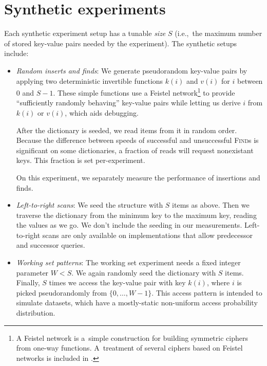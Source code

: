 \section{Synthetic experiments}
Each synthetic experiment setup has a tunable \emph{size} $S$
(i.e.,\ the maximum number of stored key-value pairs needed by the experiment).
The synthetic setups include:
\begin{itemize}
\item
	\emph{Random inserts and finds}: We generate pseudorandom key-value
	pairs by applying two deterministic invertible functions $k(i)$
	and $v(i)$ for $i$ between 0 and $S-1$.
	These simple functions use a Feistel network\footnote{%
		A Feistel network is a~simple construction for building
		symmetric ciphers from one-way functions. A~treatment of
		several ciphers based on Feistel networks is included in
		\cite{applied-cryptography}.
	} to provide
	``sufficiently randomly behaving'' key-value pairs while letting us
	derive $i$ from $k(i)$ or $v(i)$, which aids debugging.

	After the dictionary is seeded, we read items from it in random order.
	Because the difference between speeds of successful and unsuccessful
	\textsc{Find}s is significant on some dictionaries, a fraction of
	reads will request nonexistant keys. This fraction is set
	per-experiment.

	On this experiment, we separately measure the performance of insertions
	and finds.

\item
	\emph{Left-to-right scans}: We seed the structure with $S$ items
	as above. Then we traverse the dictionary from the minimum key to
	the maximum key, reading the values as we go. We don't include
	the seeding in our measurements.
	Left-to-right scans are only available on implementations that
	allow predecessor and successor queries.

\item
	\emph{Working set patterns}: The working set experiment needs
	a fixed integer parameter $W<S$. We again randomly seed the dictionary
	with $S$ items. Finally, $S$ times we access the key-value pair
	with key $k(i)$, where $i$ is picked pseudorandomly from
	$\{0,\ldots,W-1\}$.
	This access pattern is intended to simulate datasets, which have
	a mostly-static non-uniform access probability distribution.


\end{itemize}
